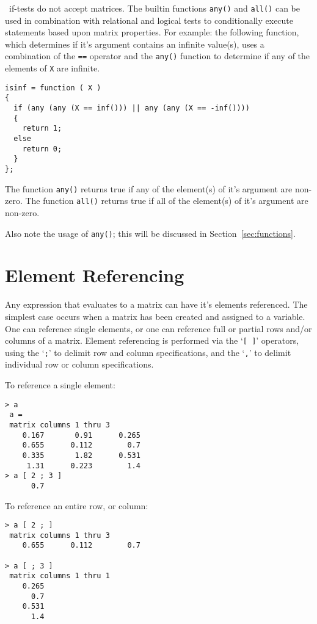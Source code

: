   \RLaB\ if-tests do not accept matrices. The builtin functions
   \verb+any()+ and \verb+all()+ can be used in combination with
   relational and logical tests to conditionally execute statements
   based upon matrix properties. For example: the following function,
   which determines if it's argument contains an infinite value(s),
   uses a combination of the \verb+==+ operator and the \verb+any()+
   function to determine if any of the elements of \verb+X+ are
   infinite.

\begin{verbatim}
isinf = function ( X )
{
  if (any (any (X == inf())) || any (any (X == -inf())))
  {
    return 1;
  else
    return 0;
  }
};
\end{verbatim}

   The function \verb+any()+ returns true if any of the element(s) of
   it's argument are non-zero. The function \verb+all()+ returns true
   if all of the element(s) of it's argument are non-zero.

   Also note the usage of \verb+any()+; this will be discussed in
   Section~\ref{sec:functions}.

\section{Element Referencing}

   Any expression that evaluates to a matrix can have it's elements
   referenced. The simplest case occurs when a matrix has been created
   and assigned to a variable. One can reference single elements, or
   one can reference full or partial rows and/or columns of a matrix.
   Element referencing is performed via the `{\verb+[ ]+}' operators,
   using the `\verb+;+' to delimit row and column specifications, and
   the `\verb+,+' to delimit individual row or column specifications.

   To reference a single element:

\begin{verbatim}
> a
 a =
 matrix columns 1 thru 3
    0.167       0.91      0.265  
    0.655      0.112        0.7  
    0.335       1.82      0.531  
     1.31      0.223        1.4  
> a [ 2 ; 3 ]
      0.7
\end{verbatim}

   To reference an entire row, or column:

\begin{verbatim}
> a [ 2 ; ]
 matrix columns 1 thru 3
    0.655      0.112        0.7  

> a [ ; 3 ]
 matrix columns 1 thru 1
    0.265  
      0.7  
    0.531  
      1.4  
\end{verbatim}

